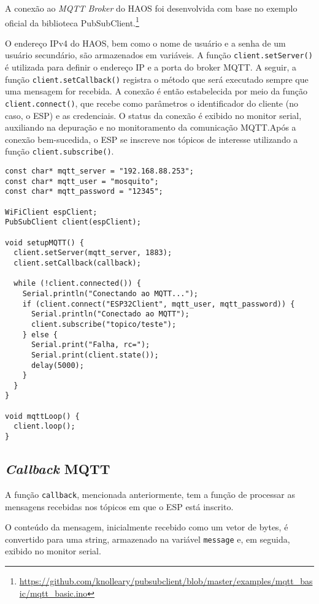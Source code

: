 \documentclass[]{abntex2}
\begin{document}
A conexão ao \textit{MQTT Broker} do HAOS foi desenvolvida com base no exemplo
oficial da biblioteca
PubSubClient.\footnote{\url{https://github.com/knolleary/pubsubclient/blob/master/examples/mqtt_basic/mqtt_basic.ino}}

O endereço IPv4 do HAOS, bem como o nome de usuário e a senha de um usuário
secundário, são armazenados em variáveis. A função \texttt{client.setServer()}
é utilizada para definir o endereço IP e a porta do broker MQTT. A seguir, a
função \texttt{client.setCallback()} registra o método que será executado
sempre que uma mensagem for recebida. A conexão é então estabelecida por meio
da função \texttt{client.connect()}, que recebe como parâmetros o identificador
do cliente (no caso, o ESP) e as credenciais. O status da conexão é exibido no
monitor serial, auxiliando na depuração e no monitoramento da comunicação
MQTT.Após a conexão bem-sucedida, o ESP se inscreve nos tópicos de interesse
utilizando a função \texttt{client.subscribe()}.

\begin{verbatim}
const char* mqtt_server = "192.168.88.253";
const char* mqtt_user = "mosquito";
const char* mqtt_password = "12345";

WiFiClient espClient;
PubSubClient client(espClient);

void setupMQTT() {
  client.setServer(mqtt_server, 1883);
  client.setCallback(callback);

  while (!client.connected()) {
    Serial.println("Conectando ao MQTT...");
    if (client.connect("ESP32Client", mqtt_user, mqtt_password)) {
      Serial.println("Conectado ao MQTT");
      client.subscribe("topico/teste");
    } else {
      Serial.print("Falha, rc=");
      Serial.print(client.state());
      delay(5000);
    }
  }
}

void mqttLoop() {
  client.loop();
}
\end{verbatim}
\clearpage
\subsection{\textit{Callback} MQTT}

A função \texttt{callback}, mencionada anteriormente, tem a função de processar
as mensagens recebidas nos tópicos em que o ESP está inscrito.

O conteúdo da mensagem, inicialmente recebido como um vetor de bytes, é
convertido para uma string, armazenado na variável \texttt{message} e, em
seguida, exibido no monitor serial.
\end{document}
